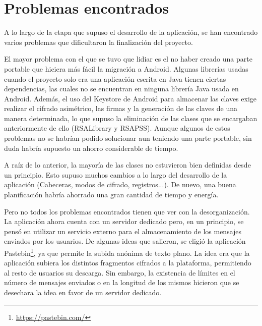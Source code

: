
\section{Problemas encontrados}

\label{Problemas encontrados}

A lo largo de la etapa que supuso el desarrollo de la aplicación, se han encontrado varios problemas que dificultaron la finalización del proyecto.

El mayor problema con el que se tuvo que lidiar es el no haber creado una parte portable que hiciera más fácil la migración a Android. Algunas librerías usadas cuando el proyecto solo era una aplicación escrita en Java tienen ciertas dependencias, las cuales no se encuentran en ninguna librería Java usada en Android. Además, el uso del Keystore de Android para almacenar las claves exige realizar el cifrado asimétrico, las firmas y la generación de las claves de una manera determinada, lo que supuso la eliminación de las clases que se encargaban anteriormente de ello (RSALibrary y RSAPSS). Aunque algunos de estos problemas no se habrían podido solucionar aun teniendo una parte portable, sin duda habría supuesto un ahorro considerable de tiempo.

A raíz de lo anterior, la mayoría de las clases no estuvieron bien definidas desde un principio. Esto supuso muchos cambios a lo largo del desarrollo de la aplicación (Cabeceras, modos de cifrado, registros...). De nuevo, una buena planificación habría ahorrado una gran cantidad de tiempo y energía.

Pero no todos los problemas encontrados tienen que ver con la desorganización. La aplicación ahora cuenta con un servidor dedicado pero, en un principio, se pensó en utilizar un servicio externo para el almacenamiento de los mensajes enviados por los usuarios. De algunas ideas que salieron, se eligió la aplicación Pastebin\footnote{\url{https://pastebin.com/}}, ya que permite la subida anónima de texto plano. La idea era que la aplicación subiera los distintos fragmentos cifrados a la plataforma, permitiendo al resto de usuarios su descarga. Sin embargo, la existencia de límites en el número de mensajes enviados o en la longitud de los mismos hicieron que se desechara la idea en favor de un servidor dedicado.
